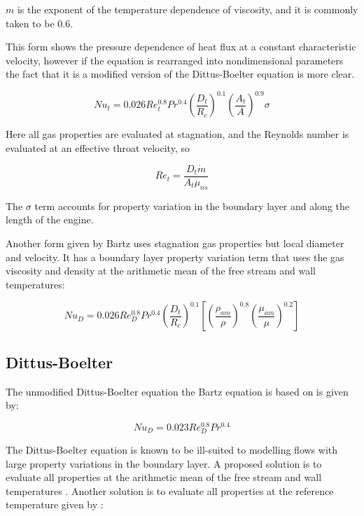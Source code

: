 \documentclass[11pt]{article}
\begin{document}
$m$ is the exponent of the temperature dependence of viscosity, and it is commonly taken to be 0.6.

This form shows the pressure dependence of heat flux at a constant characteristic velocity, however if the equation is rearranged into nondimensional parameters the fact that it is a modified version of the Dittus-Boelter equation is more clear.

\begin{equation}
  Nu_{t} = 0.026 Re_{t}^{0.8} Pr^{0.4} \left( \frac{D_t}{R_c} \right)^{0.1} \left( \frac{A_t}{A} \right)^{0.9} \sigma
\end{equation}

Here all gas properties are evaluated at stagnation, and the Reynolds number is evaluated at an effective throat velocity, so

\begin{equation}
  Re_{t} = \frac{D_t \dot{m}}{A_t \mu_{ns}}
\end{equation}

The $\sigma$ term accounts for property variation in the boundary layer and along the length of the engine.

Another form given by Bartz uses stagnation gas properties but local diameter and velocity. It has a boundary layer property variation term that uses the gas viscosity and density at the arithmetic mean of the free stream and wall temperatures:

\begin{equation}
  Nu_{D} = 0.026 Re_{D}^{0.8} Pr^{0.4} \left( \frac{D_t}{R_c} \right)^{0.1} \left[ \left( \frac{\rho_{am}}{\rho} \right)^{0.8} \left(\frac{\mu_{am}}{\mu} \right)^{0.2}\right]
\end{equation}


\subsection{Dittus-Boelter}

The unmodified Dittus-Boelter equation the Bartz equation is based on is given by:


\begin{equation}
  Nu_{D} = 0.023 Re_{D}^{0.8} Pr^{0.4}
\end{equation}

The Dittus-Boelter equation is known to be ill-suited to modelling flows with large property variations in the boundary layer. A proposed solution is to evaluate all properties at the arithmetic mean of the free stream and wall temperatures \cite{}. Another solution is to evaluate all properties at the reference temperature given by \cite{}:
\end{document}
